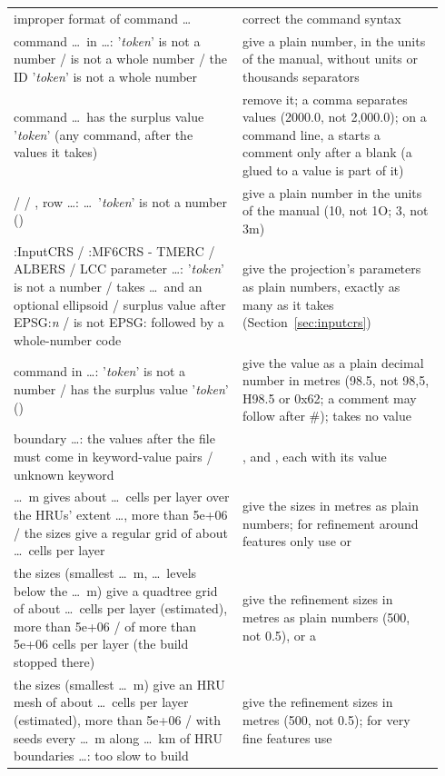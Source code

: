 \begin{longtable}{P{0.5\linewidth}P{0.44\linewidth}}
improper format of command \dots & correct the command syntax\\
command \dots\ in \dots: '\emph{token}' is not a number / is not a whole number / the ID '\emph{token}' is not a whole number & give a plain number, in the units of the manual, without units or thousands separators\\
command \dots\ has the surplus value '\emph{token}' (any  command, after the values it takes) & remove it; a comma separates values (2000.0, not 2,000.0); on a command line, a \cmd{\#} starts a comment only after a blank (a \cmd{\#} glued to a value is part of it)\\
 /  / , row \dots: \dots\ '\emph{token}' is not a number () & give a plain number in the units of the manual (10, not 1O; 3, not 3m)\\
:InputCRS / :MF6CRS - TMERC / ALBERS / LCC parameter \dots: '\emph{token}' is not a number / takes \dots\ and an optional ellipsoid / surplus value after EPSG:\emph{n} / is not EPSG: followed by a whole-number code & give the projection's parameters as plain numbers, exactly as many as it takes (Section~\ref{sec:inputcrs})\\
command  in \dots: '\emph{token}' is not a number / has the surplus value '\emph{token}' () & give the value as a plain decimal number in metres (98.5, not 98,5, H98.5 or 0x62; a comment may follow after \#);  takes no value\\
boundary \dots: the values after the file must come in keyword-value pairs / unknown keyword & ,  and , each with its value\\
 \dots\ m gives about \dots\ cells per layer over the HRUs' extent \dots, more than 5e+06 / the  sizes give a regular grid of about \dots\ cells per layer & give the sizes in metres as plain numbers; for refinement around features only use  or \\
the  sizes (smallest \dots\ m, \dots\ levels below the  \dots\ m) give a quadtree grid of about \dots\ cells per layer (estimated), more than 5e+06 / of more than 5e+06 cells per layer (the build stopped there) & give the refinement sizes in metres as plain numbers (500, not 0.5), or a \\
the  sizes (smallest \dots\ m) give an HRU mesh of about \dots\ cells per layer (estimated), more than 5e+06 / with seeds every \dots\ m along \dots\ km of HRU boundaries \dots: too slow to build & give the refinement sizes in metres (500, not 0.5); for very fine features use \\

\end{longtable}
